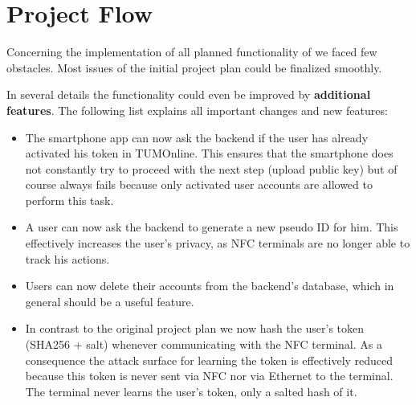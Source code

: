 \section{Project Flow}\label{sec:project_flow}

Concerning the implementation of all planned functionality of \app we faced few obstacles.
Most issues of the initial project plan could be finalized smoothly.

In several details the functionality could even be improved by \textbf{additional features}.
The following list explains all important changes and new features:
\begin{itemize}
\item The smartphone app can now ask the backend if the user has already activated his token in TUMOnline.
This ensures that the smartphone does not constantly try to proceed with the next step (upload public key) but of course always fails because only activated user accounts are allowed to perform this task.
\item A user can now ask the backend to generate a new pseudo ID for him.
This effectively increases the user's privacy, as NFC terminals are no longer able to track his actions.
\item Users can now delete their accounts from the backend's database, which in general should be a useful feature.
\item In contrast to the original project plan we now hash the user's token (SHA256 + salt) whenever communicating with the NFC terminal.
As a consequence the attack surface for learning the token is effectively reduced because this token is never sent via NFC nor via Ethernet to the terminal.
The terminal never learns the user's token, only a salted hash of it.
\end{itemize}

\bigskip


